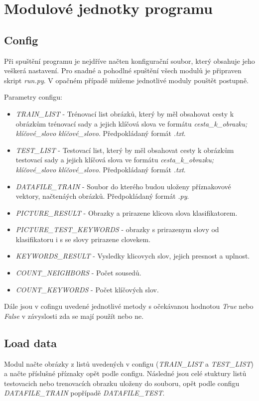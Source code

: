 \documentclass[czech,BP]{thesiskiv}
\begin{document}
\section{Modulové jednotky programu}
\subsection{Config}
\par Při spuštění programu je nejdříve načten konfigurační soubor, který obsahuje jeho veškerá nastavení. Pro snadné a pohodlné spuštění všech modulů je připraven skript \textit{run.py}. V opačném případě můžeme jednotlivé moduly pouštět postupně.

\vspace{1cm}
Parametry configu:
\begin{itemize}
	\item \textit{TRAIN\_LIST} - Trénovací list obrázků, který by měl obsahovat cesty k obrázkům trénovací sady a jejich klíčová slova ve formátu \textit{cesta\_k\_obrazku; klíčové\_slovo klíčové\_slovo}. Předpokládaný formát \textit{.txt}.
	\item \textit{TEST\_LIST} - Testovací list, který by měl obsahovat cesty k obrázkům testovací sady a jejich klíčová slova ve formátu \textit{cesta\_k\_obrazku; klíčové\_slovo klíčové\_slovo}. Předpokládaný formát \textit{.txt}.
	\item \textit{DATAFILE\_TRAIN} - Soubor do kterého budou uloženy příznakovové vektory, načtenáých obrázků. Předpokládaný formát \textit{.py}.
	\item \textit{PICTURE\_RESULT} - Obrazky a prirazene klicova slova klasifikatorem.
	\item \textit{PICTURE\_TEST\_KEYWORDS} - obrazky s prirazenym slovy od klasifikatoru i s se slovy prirazene clovekem.
	\item \textit{KEYWORDS\_RESULT} - Vysledky klicovych slov, jejich presnost a uplnost.
	\item \textit{COUNT\_NEIGHBORS} - Počet sousedů.
	\item \textit{COUNT\_KEYWORDS} - Počet klíčových slov.
\end{itemize}
Dále jsou v cofingu uvedené jednotlivé metody s očekávanou hodnotou \textit{True} nebo \textit{False} v závyslosti zda se mají použít nebo ne.

\subsection{Load data}
Modul načte obrázky z listů uvedených v configu (\textit{TRAIN\_LIST} a \textit{TEST\_LIST}) a načte příslušné příznaky opět podle configu. Následné jsou celé stuktury listů testovacich nebo trenovacích obrazku uloženy do souboru, opět podle configu \textit{DATAFILE\_TRAIN} popřípadě \textit{DATAFILE\_TEST}.
\end{document}
